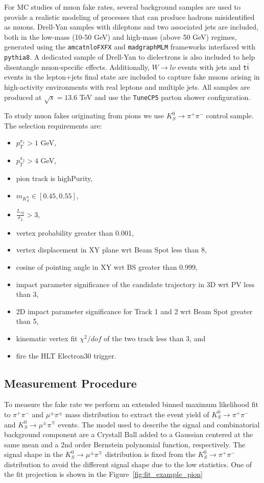 For MC studies of muon fake rates, several background samples are used to provide a realistic modeling of processes that can produce hadrons misidentified as muons. Drell-Yan samples with dileptons and two associated jets are included, both in the low-mass (10-50 GeV) and high-mass (above 50 GeV) regimes, generated using the \texttt{amcatnloFXFX} and \texttt{madgraphMLM} frameworks interfaced with \texttt{pythia8}. A dedicated sample of Drell-Yan to dielectrons is also included to help disentangle muon-specific effects. Additionally, \texttt{$W\to l \nu$} events with jets and \texttt{t$\bar{\text{t}}$} events in the lepton+jets final state are included to capture fake muons arising in high-activity environments with real leptons and multiple jets. All samples are produced at $\sqrt{s} = 13.6$ TeV and use the \texttt{TuneCP5} parton shower configuration.

To study muon fakes originating from pions we use $K_S^0 \to \pi^+ \pi^-$ control sample. The selection requirements are:
\begin{itemize}
\item $p_{T}^{\pi_1}>1$ GeV,
\item $p_{T}^{\pi_2}>4$ GeV,
\item pion track is highPurity,
\item $m_{K_S^0}\in[0.45,0.55]$,
\item $\frac{L_{xy}}{\sigma_L}>3$,
\item vertex probability greater than 0.001,
\item vertex displacement in XY plane wrt Beam Spot less than 8,
\item cosine of pointing angle in XY wrt BS greater than 0.999,
\item impact parameter significance of the candidate trajectory in 3D wrt PV less than 3,
\item 2D impact parameter significance for Track 1 and 2 wrt Beam Spot greater than 5,
\item kinematic vertex fit $\chi^{2}/dof$ of the two track less than 3, and
\item fire the HLT Electron30 trigger.
\end{itemize}


\subsection{Measurement Procedure}

To measure the fake rate we perform an extended binned maximum likelihood fit to
$\pi^{+}\pi^{-}$ and $\mu^{\pm}\pi^{\pm}$ mass distribution to extract
the event yield of $K_S^0 \to \pi^+ \pi^-$ and $K_S^0 \to \mu^\pm \pi^\mp$ events. The model used to describe the signal and combinatorial background component are a Crystall Ball added to a  Gaussian centered at the same mean and a 2nd order Bernstein polynomial function, respectively. The signal shape in the $K_S^0 \to \mu^\pm \pi^\mp$ distribution is fixed from the $K_S^0 \to \pi^+ \pi^-$  distribution to avoid the different signal shape due to the low statistics. One of the fit projection is shown in the Figure~\ref{fig:fit_example_pion}

